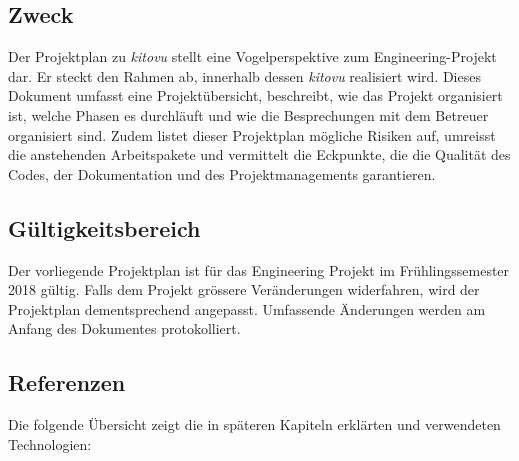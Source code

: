 \documentclass[a4paper]{article}
\begin{document}
\subsection{Zweck}
Der Projektplan zu \emph{kitovu} stellt eine Vogelperspektive zum Engineering-Projekt dar. Er steckt den Rahmen ab, innerhalb dessen \emph{kitovu} realisiert wird. Dieses Dokument umfasst eine Projektübersicht, beschreibt, wie das Projekt organisiert ist, welche Phasen es durchläuft und wie die Besprechungen mit dem Betreuer organisiert sind. Zudem listet dieser Projektplan mögliche Risiken auf, umreisst die anstehenden Arbeitspakete und vermittelt die Eckpunkte, die die Qualität des Codes, der Dokumentation und des Projektmanagements garantieren.

\subsection{Gültigkeitsbereich}
Der vorliegende Projektplan ist für das Engineering Projekt im Frühlingssemester 2018 gültig. Falls dem Projekt grössere Veränderungen widerfahren, wird der Projektplan dementsprechend angepasst. Umfassende Änderungen werden am Anfang des Dokumentes protokolliert.

\subsection{Referenzen}


Die folgende Übersicht zeigt die in späteren Kapiteln erklärten und verwendeten Technologien:
\end{document}
